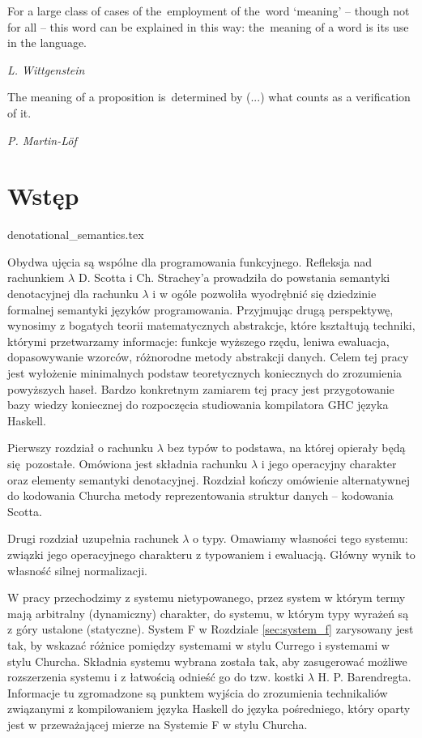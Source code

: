 \epigraph{
For a large class of cases of the~employment of the~word ‘meaning’ -- though not for all -- this word can be explained in this way: the~meaning of a word is its use in the language. \cite{Wittgenstein53}
}{\emph{\small{L. Wittgenstein}}}

\epigraph{The meaning of a proposition is~determined by (...) what counts as a
verification of it. \cite{Lof_96}}{\emph{\small{{P. Martin-Löf}}}}


\section*{Wstęp}
{denotational_semantics.tex}

Obydwa ujęcia są wspólne dla programowania funkcyjnego. Refleksja nad rachunkiem \(\lambda\) D. Scotta i Ch. Strachey'a prowadziła do powstania semantyki denotacyjnej dla rachunku \(\lambda\) i w ogóle pozwoliła wyodrębnić się dziedzinie formalnej semantyki języków programowania. Przyjmując drugą perspektywę, wynosimy z bogatych teorii matematycznych abstrakcje, które kształtują techniki, którymi przetwarzamy informacje: funkcje wyższego rzędu, leniwa ewaluacja, dopasowywanie wzorców, różnorodne metody abstrakcji danych. 
Celem tej pracy jest wyłożenie minimalnych podstaw teoretycznych koniecznych do zrozumienia powyższych haseł. Bardzo konkretnym zamiarem tej pracy jest przygotowanie bazy wiedzy koniecznej do rozpoczęcia studiowania kompilatora GHC języka Haskell.

Pierwszy rozdział o rachunku \(\lambda\) bez typów to podstawa, na której opierały będą się pozostałe. Omówiona jest składnia rachunku \(\lambda\) i jego operacyjny charakter oraz elementy semantyki denotacyjnej. Rozdział kończy omówienie alternatywnej do kodowania Churcha metody reprezentowania struktur danych -- kodowania Scotta.

Drugi rozdział uzupełnia rachunek \(\lambda\) o typy. Omawiamy własności tego systemu: związki jego operacyjnego charakteru z typowaniem i ewaluacją. Główny wynik to własność silnej normalizacji.

W pracy przechodzimy z systemu nietypowanego, przez system w którym termy mają arbitralny (dynamiczny) charakter, do systemu, w którym typy wyrażeń są z góry ustalone (statyczne). System F w Rozdziale \ref{sec:system_f} zarysowany jest tak, by wskazać różnice pomiędzy systemami w stylu Currego i systemami w stylu Churcha. Składnia systemu wybrana została tak, aby zasugerować możliwe rozszerzenia systemu i z łatwością odnieść go do tzw. kostki \(\lambda\) H. P. Barendregta. Informacje tu zgromadzone są punktem wyjścia do zrozumienia technikaliów związanymi z kompilowaniem języka Haskell do języka pośredniego, który oparty jest w przeważającej mierze na Systemie F w stylu Churcha. 
